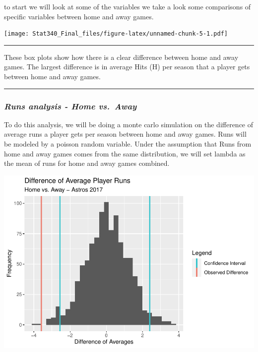 \documentclass[
]{article}
\begin{document}
to start we will look at some of the variables we take a look some
comparisons of specific variables between home and away games.

\texttt{[image: Stat340\_Final\_files/figure-latex/unnamed-chunk-5-1.pdf]}

\begin{center}\rule{0.5\linewidth}{0.5pt}\end{center}

These box plots show how there is a clear difference between home and
away games. The largest difference is in average Hits (H) per season
that a player gets between home and away games.

\begin{center}\rule{0.5\linewidth}{0.5pt}\end{center}

\hypertarget{runs-analysis---home-vs.-away}{%
\subsubsection{\texorpdfstring{\emph{Runs analysis - Home
vs.~Away}}{Runs analysis - Home vs.~Away}}\label{runs-analysis---home-vs.-away}}

To do this analysis, we will be doing a monte carlo simulation on the
difference of average runs a player gets per season between home and
away games. Runs will be modeled by a poisson random variable. Under the
assumption that Runs from home and away games comes from the same
distribution, we will set lambda as the mean of runs for home and away
games combined.

\includegraphics{Stat340_Final_files/figure-latex/mc_runs-1.pdf}
\end{document}
